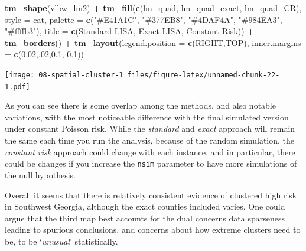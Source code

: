 \documentclass[
]{book}
\newenvironment{Shaded}{\begin{snugshade}}{\end{snugshade}}
\newcommand{\AttributeTok}[1]{\textcolor[rgb]{0.13,0.29,0.53}{#1}}
\newcommand{\DecValTok}[1]{\textcolor[rgb]{0.00,0.00,0.81}{#1}}
\newcommand{\FloatTok}[1]{\textcolor[rgb]{0.00,0.00,0.81}{#1}}
\newcommand{\FunctionTok}[1]{\textcolor[rgb]{0.13,0.29,0.53}{\textbf{#1}}}
\newcommand{\NormalTok}[1]{#1}
\newcommand{\SpecialCharTok}[1]{\textcolor[rgb]{0.81,0.36,0.00}{\textbf{#1}}}
\newcommand{\StringTok}[1]{\textcolor[rgb]{0.31,0.60,0.02}{#1}}
\begin{document}
\begin{Shaded}
\begin{Highlighting}[]
\FunctionTok{tm\_shape}\NormalTok{(vlbw\_lm2) }\SpecialCharTok{+} 
  \FunctionTok{tm\_fill}\NormalTok{(}\FunctionTok{c}\NormalTok{(}\StringTok{\textquotesingle{}lm\_quad\textquotesingle{}}\NormalTok{, }\StringTok{\textquotesingle{}lm\_quad\_exact\textquotesingle{}}\NormalTok{, }\StringTok{\textquotesingle{}lm\_quad\_CR\textquotesingle{}}\NormalTok{),}
          \AttributeTok{style =} \StringTok{\textquotesingle{}cat\textquotesingle{}}\NormalTok{,}
          \AttributeTok{palette =} \FunctionTok{c}\NormalTok{(}\StringTok{"\#E41A1C"}\NormalTok{, }\StringTok{"\#377EB8"}\NormalTok{, }\StringTok{"\#4DAF4A"}\NormalTok{, }\StringTok{"\#984EA3"}\NormalTok{, }\StringTok{"\#ffffb3"}\NormalTok{),}
          \AttributeTok{title =} \FunctionTok{c}\NormalTok{(}\StringTok{\textquotesingle{}Standard LISA\textquotesingle{}}\NormalTok{, }\StringTok{\textquotesingle{}Exact LISA\textquotesingle{}}\NormalTok{, }\StringTok{\textquotesingle{}Constant Risk\textquotesingle{}}\NormalTok{)) }\SpecialCharTok{+}
  \FunctionTok{tm\_borders}\NormalTok{() }\SpecialCharTok{+}
  \FunctionTok{tm\_layout}\NormalTok{(}\AttributeTok{legend.position =} \FunctionTok{c}\NormalTok{(}\StringTok{\textquotesingle{}RIGHT\textquotesingle{}}\NormalTok{,}\StringTok{\textquotesingle{}TOP\textquotesingle{}}\NormalTok{),}
            \AttributeTok{inner.margins =} \FunctionTok{c}\NormalTok{(}\FloatTok{0.02}\NormalTok{,.}\DecValTok{02}\NormalTok{,}\FloatTok{0.1}\NormalTok{, }\FloatTok{0.1}\NormalTok{))}
\end{Highlighting}
\end{Shaded}

\texttt{[image: 08-spatial-cluster-1\_files/figure-latex/unnamed-chunk-22-1.pdf]}

As you can see there is some overlap among the methods, and also notable variations, with the most noticeable difference with the final simulated version under constant Poisson risk. While the \emph{standard} and \emph{exact} approach will remain the same each time you run the analysis, because of the random simulation, the \emph{constant risk} approach could change with each instance, and in particular, there could be changes if you increase the \texttt{nsim} parameter to have more simulations of the null hypothesis.

Overall it seems that there is relatively consistent evidence of clustered high risk in Southwest Georgia, although the exact counties included varies. One could argue that the third map best accounts for the dual concerns data sparseness leading to spurious conclusions, and concerns about how extreme clusters need to be, to be `\emph{unusual}' statistically.
\end{document}
